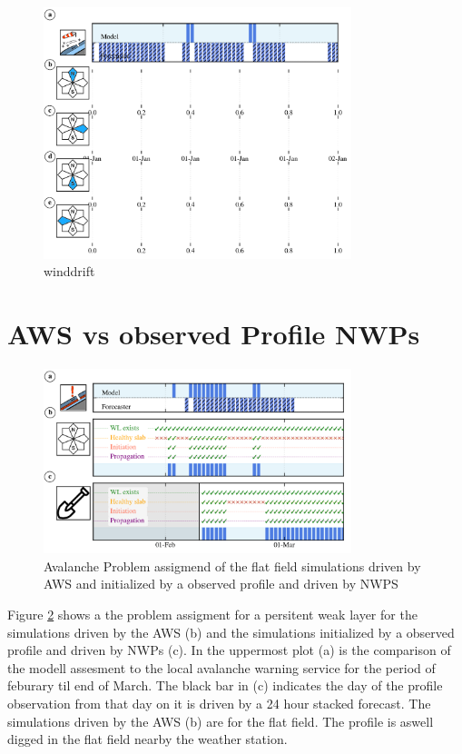 \begin{figure}[h]
    \centering
    \includegraphics[width=0.8\textwidth]{Figures/figures_avapro/AXLIZ/winddrift_AXLIZ.png}
    \caption{winddrift}
    \label{fig:AWS_vs_NWPS}
\end{figure}

\section{AWS vs observed Profile NWPs}

\begin{figure}[h]
    \centering
    \includegraphics[width=0.8\textwidth]{Figures/figures_avapro/AXLIZ/persitent_profile_comp.png}
    \caption{Avalanche Problem assigmend of the flat field simulations driven by AWS 
    and initialized by a observed profile and driven by NWPS}
    \label{fig:AWS_vs_NWPS}
\end{figure}

\noindent Figure \ref{fig:AWS_vs_NWPS} shows a the problem assigment for a persitent weak layer for the simulations driven by the AWS (b)
and the simulations initialized by a observed profile and driven by NWPs (c). In the uppermost plot (a) is the comparison of the modell
assesment to the local  avalanche warning service for the period of feburary til end of March. The black bar in (c) indicates the day of 
the profile observation from that day on it is driven by a 24 hour stacked forecast. The simulations driven by the AWS (b) are for the flat
field. The profile is aswell digged in the flat field nearby the weather station. 

